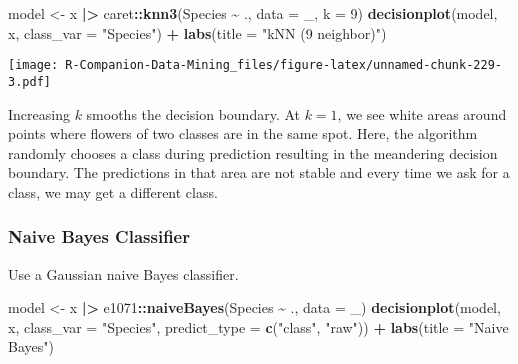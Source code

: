\documentclass[
  notitlepage]{book}
\newenvironment{Shaded}{\begin{snugshade}}{\end{snugshade}}
\newcommand{\DataTypeTok}[1]{\textcolor[rgb]{0.13,0.29,0.53}{#1}}
\newcommand{\DecValTok}[1]{\textcolor[rgb]{0.00,0.00,0.81}{#1}}
\newcommand{\ErrorTok}[1]{\textcolor[rgb]{0.64,0.00,0.00}{\textbf{#1}}}
\newcommand{\KeywordTok}[1]{\textcolor[rgb]{0.13,0.29,0.53}{\textbf{#1}}}
\newcommand{\NormalTok}[1]{#1}
\newcommand{\OperatorTok}[1]{\textcolor[rgb]{0.81,0.36,0.00}{\textbf{#1}}}
\newcommand{\StringTok}[1]{\textcolor[rgb]{0.31,0.60,0.02}{#1}}
\begin{document}
\begin{Shaded}
\begin{Highlighting}[]
\NormalTok{model \textless{}{-}}\StringTok{ }\NormalTok{x }\OperatorTok{|}\ErrorTok{\textgreater{}}\StringTok{ }\NormalTok{caret}\OperatorTok{::}\KeywordTok{knn3}\NormalTok{(Species }\OperatorTok{\textasciitilde{}}\StringTok{ }\NormalTok{., }\DataTypeTok{data =}\NormalTok{ \_, }\DataTypeTok{k =} \DecValTok{9}\NormalTok{)}
\KeywordTok{decisionplot}\NormalTok{(model, x, }\DataTypeTok{class\_var =} \StringTok{"Species"}\NormalTok{) }\OperatorTok{+}\StringTok{ }
\StringTok{  }\KeywordTok{labs}\NormalTok{(}\DataTypeTok{title =} \StringTok{"kNN (9 neighbor)"}\NormalTok{)}
\end{Highlighting}
\end{Shaded}

\texttt{[image: R-Companion-Data-Mining\_files/figure-latex/unnamed-chunk-229-3.pdf]}

Increasing \(k\) smooths the decision boundary. At \(k=1\), we see white
areas around points where flowers of two classes are in the same spot.
Here, the algorithm randomly chooses a class during prediction resulting
in the meandering decision boundary. The predictions in that area are
not stable and every time we ask for a class, we may get a different
class.

\hypertarget{naive-bayes-classifier-1}{%
\subsubsection{Naive Bayes Classifier}\label{naive-bayes-classifier-1}}

Use a Gaussian naive Bayes classifier.

\begin{Shaded}
\begin{Highlighting}[]
\NormalTok{model \textless{}{-}}\StringTok{ }\NormalTok{x }\OperatorTok{|}\ErrorTok{\textgreater{}}\StringTok{ }\NormalTok{e1071}\OperatorTok{::}\KeywordTok{naiveBayes}\NormalTok{(Species }\OperatorTok{\textasciitilde{}}\StringTok{ }\NormalTok{., }\DataTypeTok{data =}\NormalTok{ \_)}
\KeywordTok{decisionplot}\NormalTok{(model, x, }\DataTypeTok{class\_var =} \StringTok{"Species"}\NormalTok{, }
             \DataTypeTok{predict\_type =} \KeywordTok{c}\NormalTok{(}\StringTok{"class"}\NormalTok{, }\StringTok{"raw"}\NormalTok{)) }\OperatorTok{+}\StringTok{ }
\StringTok{  }\KeywordTok{labs}\NormalTok{(}\DataTypeTok{title =} \StringTok{"Naive Bayes"}\NormalTok{)}
\end{Highlighting}
\end{Shaded}
\end{document}
